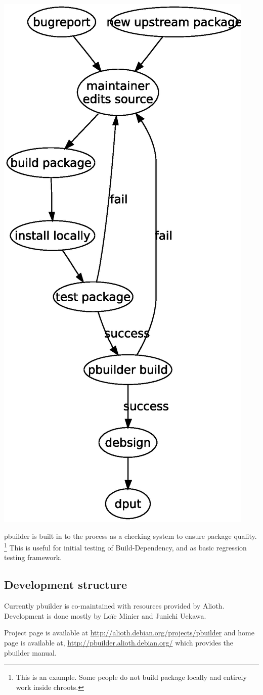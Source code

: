 \documentclass[a4paper]{article}
\begin{document}
\begin{center}
 \includegraphics[width=0.6\hsize]{develcycle.eps}
\end{center}

pbuilder is built in to the process as a checking system to ensure
package quality.  \footnote{This is an example. Some people do not build
package locally and entirely work inside chroots.}  This is useful for
initial testing of Build-Dependency, and as basic regression testing
framework.

\subsection{Development structure}

Currently pbuilder is co-maintained with resources provided by Alioth.
Development is done mostly by Lo\"ic Minier and Junichi Uekawa.

Project page is available at 
\url{http://alioth.debian.org/projects/pbuilder}
and home page is available at, 
\url{http://pbuilder.alioth.debian.org/}
which provides the pbuilder manual.
\end{document}
